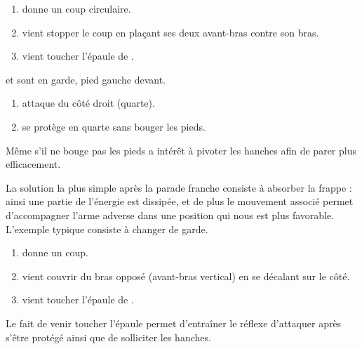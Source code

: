 \begin{exercice}
	
	\obj{}
	
	\begin{enumerate}
		\item \A donne un coup circulaire.
		
		\item \D vient stopper le coup en plaçant ses deux avant-bras contre son bras.
		
		\item \D vient toucher l'épaule de \A.
	\end{enumerate}
\end{exercice}


\begin{exercice}

	\A et \D sont en garde, pied gauche devant.

	\begin{enumerate}
		\item \A attaque \D du côté droit (quarte).
		
		\item \D se protège en quarte sans bouger les pieds.
	\end{enumerate}

	Même s'il ne bouge pas les pieds \D a intérêt à pivoter les hanches afin de parer plus efficacement.
\end{exercice}


La solution la plus simple après la parade franche consiste à absorber la frappe : ainsi une partie de l'énergie est dissipée, et de plus le mouvement associé permet d'accompagner l'arme adverse dans une position qui nous est plus favorable.
L'exemple typique consiste à changer de garde.


\begin{exercice}

	\begin{enumerate}
		\item \A donne un coup.
		
		\item \D vient couvrir du bras opposé (avant-bras vertical) en se décalant sur le côté.
		
		\item \D vient toucher l'épaule de \A.
	\end{enumerate}

	Le fait de venir toucher l'épaule permet d'entraîner le réflexe d'attaquer après s'être protégé ainsi que de solliciter les hanches.
\end{exercice}


